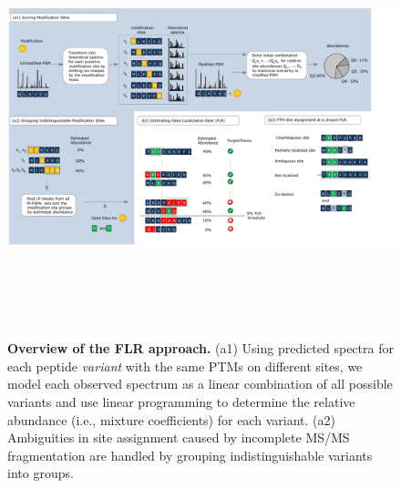 \documentclass[arial,11pt]{article}
\begin{document}
\begin{figure}
\begin{center}
\includegraphics[height=120mm]{./Figures/FLR/intro}
\caption{\footnotesize {\bf Overview of the FLR approach.} %
(a1) Using predicted spectra for each peptide {\em variant} with the same PTMs on different sites, we model each observed spectrum as a linear combination of all possible variants and use linear programming to determine the relative abundance (i.e., mixture coefficients) for each variant.
(a2) Ambiguities in site assignment caused by incomplete MS/MS fragmentation are handled by grouping indistinguishable variants into groups. %
}
\end{center}
\end{figure}
\end{document}
